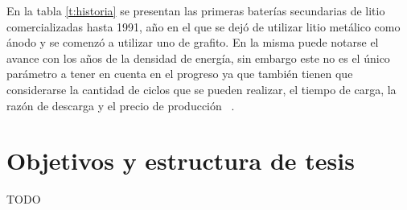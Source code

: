 En la tabla \ref{t:historia} se presentan las primeras baterías secundarias de 
litio comercializadas hasta 1991, año en el que se dejó de utilizar litio 
metálico como ánodo y se comenzó a utilizar uno de grafito. En la misma puede 
notarse el avance con los años de la densidad de energía, sin embargo este no es 
el único parámetro a tener en cuenta en el progreso ya que también tienen que 
considerarse la cantidad de ciclos que se pueden realizar, el tiempo de carga, la 
razón de descarga y el precio de producción ~\cite{reddy2020}. 
\begin{table}[h]
    \centering
    \caption{Primeras baterías de litio recargables comercializadas 
    ~\cite{reddy2020}.}
    \setlength\extrarowheight{2pt}
    \label{t:historia}
\end{table}

\section{Objetivos y estructura de tesis}

TODO
